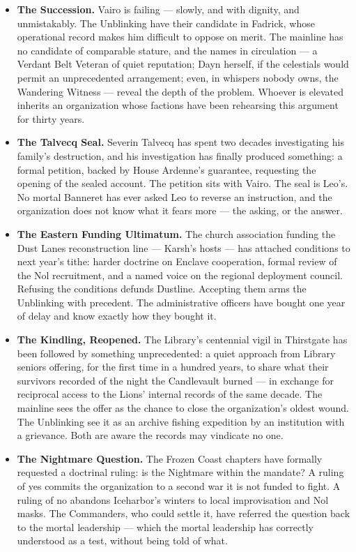 \begin{itemize}
    \item \textbf{The Succession.} Vairo is failing --- slowly, and with dignity, and unmistakably. The Unblinking have their candidate in Fadrick, whose operational record makes him difficult to oppose on merit. The mainline has no candidate of comparable stature, and the names in circulation --- a Verdant Belt Veteran of quiet reputation; Dayn herself, if the celestials would permit an unprecedented arrangement; even, in whispers nobody owns, the Wandering Witness --- reveal the depth of the problem. Whoever is elevated inherits an organization whose factions have been rehearsing this argument for thirty years.
    \item \textbf{The Talvecq Seal.} Severin Talvecq has spent two decades investigating his family's destruction, and his investigation has finally produced something: a formal petition, backed by House Ardenne's guarantee, requesting the opening of the sealed account. The petition sits with Vairo. The seal is Leo's. No mortal Banneret has ever asked Leo to reverse an instruction, and the organization does not know what it fears more --- the asking, or the answer.
    \item \textbf{The Eastern Funding Ultimatum.} The church association funding the Dust Lanes reconstruction line --- Karsh's hosts --- has attached conditions to next year's tithe: harder doctrine on Enclave cooperation, formal review of the Nol recruitment, and a named voice on the regional deployment council. Refusing the conditions defunds Dustline. Accepting them arms the Unblinking with precedent. The administrative officers have bought one year of delay and know exactly how they bought it.
    \item \textbf{The Kindling, Reopened.} The Library's centennial vigil in Thirstgate has been followed by something unprecedented: a quiet approach from Library seniors offering, for the first time in a hundred years, to share what their survivors recorded of the night the Candlevault burned --- in exchange for reciprocal access to the Lions' internal records of the same decade. The mainline sees the offer as the chance to close the organization's oldest wound. The Unblinking see it as an archive fishing expedition by an institution with a grievance. Both are aware the records may vindicate no one.
    \item \textbf{The Nightmare Question.} The Frozen Coast chapters have formally requested a doctrinal ruling: is the Nightmare within the mandate? A ruling of yes commits the organization to a second war it is not funded to fight. A ruling of no abandons Iceharbor's winters to local improvisation and Nol masks. The Commanders, who could settle it, have referred the question back to the mortal leadership --- which the mortal leadership has correctly understood as a test, without being told of what.

\end{itemize}

